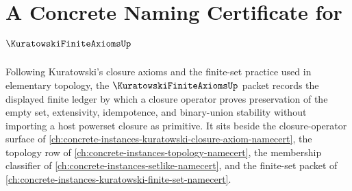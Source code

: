 \chapter{A Concrete Naming Certificate for $\KuratowskiFiniteAxiomsUp$}
\label{ch:concrete-instances-kuratowski-finite-axioms-namecert}

Following Kuratowski's closure axioms and the finite-set practice used in elementary topology, the $\KuratowskiFiniteAxiomsUp$ packet records the displayed finite ledger by which a closure operator proves preservation of the empty set, extensivity, idempotence, and binary-union stability without importing a host powerset closure as primitive. It sits beside the closure-operator surface of \autoref{ch:concrete-instances-kuratowski-closure-axiom-namecert}, the topology row of \autoref{ch:concrete-instances-topology-namecert}, the membership classifier of \autoref{ch:concrete-instances-setlike-namecert}, and the finite-set packet of \autoref{ch:concrete-instances-kuratowski-finite-set-namecert}.

